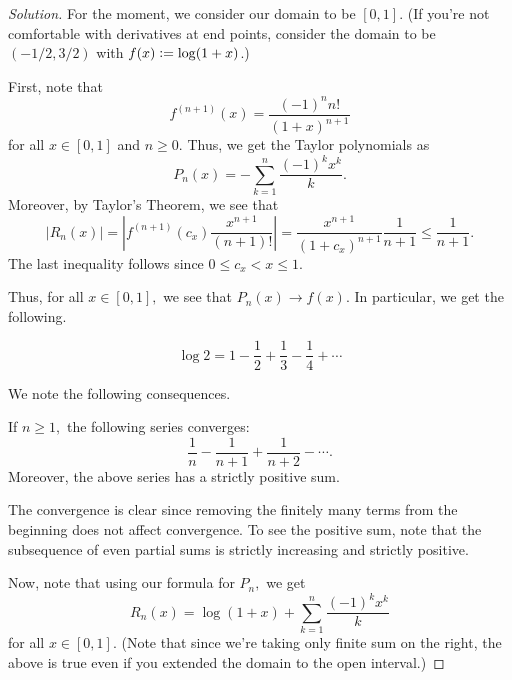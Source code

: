 \documentclass[12pt]{article}
\theoremstyle{definition}
\newenvironment{soln}{\begin{proof}[Solution]}{\end{proof}}
\newcommand{\md}[1]{\left\lvert #1 \right\lvert}
\begin{document}
\begin{soln}
	For the moment, we consider our domain to be $[0, 1].$ (If you're not comfortable with derivatives at end points, consider the domain to be $(-1/2, 3/2)$ with $f(x) \vcentcolon= \log(1 + x)$.)

	First, note that
	\begin{equation*} 
		f^{(n + 1)}(x) = \dfrac{(-1)^nn!}{(1 + x)^{n+1}}
	\end{equation*}
	for all $x \in [0, 1]$ and $n \ge 0.$ Thus, we get the Taylor polynomials as
	\begin{equation*} 
		P_n(x) = -\sum_{k = 1}^{n}\dfrac{(-1)^kx^k}{k}.
	\end{equation*}
	Moreover, by Taylor's Theorem, we see that
	\begin{equation*} 
		\md{R_n(x)} = \md{f^{(n+1)}(c_x)\dfrac{x^{n+1}}{(n + 1)!}} = \dfrac{x^{n+1}}{(1 + c_x)^{n+1}}\dfrac{1}{n + 1} \le \dfrac{1}{n + 1}.
	\end{equation*}
	The last inequality follows since $0 \le c_x < x \le 1.$

	Thus, for all $x \in [0, 1],$ we see that $P_n(x) \to f(x).$ In particular, we get the following.

	\begin{thm}
		\begin{equation*} 
			\log 2 = 1 - \dfrac{1}{2} + \dfrac{1}{3} - \dfrac{1}{4} + \cdots
		\end{equation*}
	\end{thm}

	We note the following consequences.

	\begin{cor}
		If $n \ge 1,$ the following series converges:
		\begin{equation*} 
			\dfrac{1}{n} - \dfrac{1}{n+1} + \dfrac{1}{n+2} - \cdots.
		\end{equation*}
		Moreover, the above series has a strictly positive sum.
	\end{cor}
	The convergence is clear since removing the finitely many terms from the beginning does not affect convergence. To see the positive sum, note that the subsequence of even partial sums is strictly increasing and strictly positive.

	Now, note that using our formula for $P_n,$ we get
	\begin{equation*} 
		R_n(x) = \log(1 + x) + \sum_{k = 1}^{n}\dfrac{(-1)^kx^k}{k}
	\end{equation*}
	for all $x \in [0, 1].$ (Note that since we're taking only finite sum on the right, the above is true even if you extended the domain to the open interval.) 


\end{soln}
\end{document}
